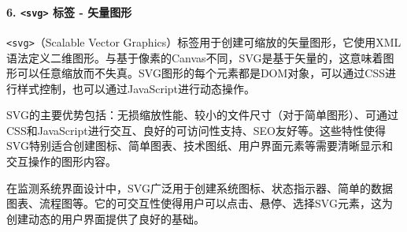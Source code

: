 \begin{Shaded}
\begin{Highlighting}[]
    \OperatorTok{===} \NormalTok{) \{}
\OperatorTok{,}\OperatorTok{;}
\NormalTok{    \} }\NormalTok{ \{}
\OperatorTok{,}\OperatorTok{;}
\NormalTok{    \}}
\NormalTok{\}}
\NormalTok{()}\OperatorTok{;}

 \OperatorTok{=} \StringTok{\textquotesingle{}333\textquotesingle{}}\OperatorTok{;}
 \OperatorTok{=} \OperatorTok{;}
 \OperatorTok{=} \OperatorTok{;}
\NormalTok{(}\OperatorTok{,} \OperatorTok{/} \OperatorTok{,} \NormalTok{)}\OperatorTok{;}
\DataTypeTok{\textless{}/}\DataTypeTok{\textgreater{}}
\end{Highlighting}
\end{Shaded}

\paragraph{\texorpdfstring{6. \texttt{\textless{}svg\textgreater{}} 标签 - 矢量图形}{6. \textless svg\textgreater{} 标签 - 矢量图形}}\label{svg-ux6807ux7b7e---ux77e2ux91cfux56feux5f62}

\texttt{\textless{}svg\textgreater{}}（Scalable Vector Graphics）标签用于创建可缩放的矢量图形，它使用XML语法定义二维图形。与基于像素的Canvas不同，SVG是基于矢量的，这意味着图形可以任意缩放而不失真。SVG图形的每个元素都是DOM对象，可以通过CSS进行样式控制，也可以通过JavaScript进行动态操作。

SVG的主要优势包括：无损缩放性能、较小的文件尺寸（对于简单图形）、可通过CSS和JavaScript进行交互、良好的可访问性支持、SEO友好等。这些特性使得SVG特别适合创建图标、简单图表、技术图纸、用户界面元素等需要清晰显示和交互操作的图形内容。

在监测系统界面设计中，SVG广泛用于创建系统图标、状态指示器、简单的数据图表、流程图等。它的可交互性使得用户可以点击、悬停、选择SVG元素，这为创建动态的用户界面提供了良好的基础。

